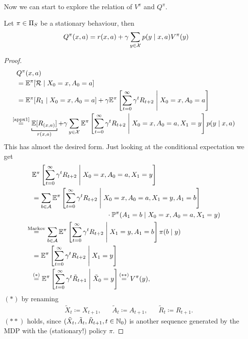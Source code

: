 Now we can start to explore the relation of \(V^\pi\) and \(Q^\pi\).

\begin{prop}\label{expand Q^pi} Let \(\pi\in\Pi_S\) be a stationary behaviour, then
	\[Q^\pi(x,a)=r(x,a)+\gamma\sum_{y\in\mathcal{X}}p(y\mid x,a)V^\pi(y)\]
\end{prop}

\begin{proof}\leavevmode
\begin{align*}
&Q^\pi(x,a) \\
&= \E^\pi[\cR\mid X_0=x, A_0=a]\\
&=\E^\pi[R_1\mid X_0=x,A_0=a]
+\gamma\E^\pi\left[\sum_{t=0}^\infty\gamma^t R_{t+2}\;\middle|\; X_0=x,A_0=a\right]\\
&\lxeq{\text{\ref{appx1}}} \underbracket[0.7pt]{\E[R_{(x,a)}]}_{r(x,a)} 
 + \gamma \sum_{y\in\cX}\E^\pi\left[\sum_{t=0}^\infty\gamma^t R_{t+2} \;\middle|\; X_0=x,A_0=a, X_1=y\right]p(y\mid x, a)\\
\end{align*}
This has almost the desired form. Just looking at the conditional expectation we get
\begin{align*}
	&\E^\pi\left[\sum_{t=0}^\infty\gamma^t R_{t+2} \;\middle|\; X_0=x,A_0=a, X_1=y\right]\\
	&=\sum_{b\in\cA}
	\begin{aligned}[t]
	&\E^\pi\left[\sum_{t=0}^\infty\gamma^t R_{t+2} 
	\;\middle|\; X_0=x,A_0=a, X_1=y,A_1=b \right]\\
	&\qquad\qquad\qquad\qquad\cdot \Pr^\pi(A_1=b \mid X_0=x,A_0=a, X_1=y) 
	\end{aligned}
	\\
	&\lxeq{\text{Markov}} 
	\sum_{b\in\cA}\E^\pi\left[\sum_{t=0}^\infty\gamma^t R_{t+2} \;\middle|\; X_1=y,A_1=b \right]
	\pi(b\mid y)\\
	&= \E^\pi\left[\sum_{t=0}^\infty\gamma^t R_{t+2}\;\middle|\; X_1=y \right] \\
 	&\lxeq{(*)} \E^\pi\left[\sum_{t=0}^\infty\gamma^t \tilde{R}_{t+1}\;\middle|\; \tilde{X}_0=y \right]\xeq{(**)}V^\pi(y),
\end{align*}
\((*)\) by renaming 
\begin{align*}
	&\tilde{X}_{t}\coloneqq X_{t+1}, && \tilde{A}_t\coloneqq A_{t+1},
	&&\tilde{R}_{t}\coloneqq R_{t+1}.
\end{align*}
\((**)\) holds, since \((\tilde{X}_t,\tilde{A}_t,\tilde{R}_{t+1}, t\in\mathbb{N}_0)\) is another sequence generated by the MDP with the (stationary!) policy \(\pi\).
\end{proof}

